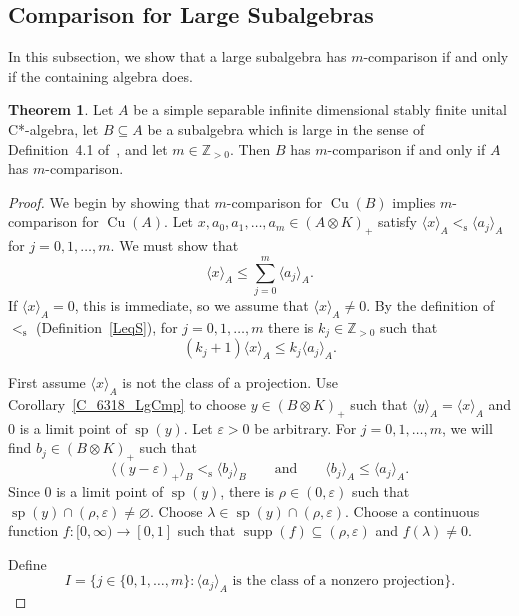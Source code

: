 \documentclass[10pt]{amsart}
\numberwithin{equation}{section}
\theoremstyle{definition}
\newtheorem{thm}{Theorem}[section]
\newcommand{\ep}{\varepsilon}
\newcommand{\ld}{\lambda}
\newcommand{\rh}{\rho}
\newcommand{\N}{{\mathbb{Z}}_{> 0}}
\newcommand{\spec}{{\operatorname{sp}}}
\newcommand{\supp}{{\operatorname{supp}}}
\newcommand{\Cu}{{\operatorname{Cu}}}
\newcommand{\andeqn}{\qquad {\mbox{and}} \qquad}
\newcommand{\cfn}{continuous function}
\renewcommand{\S}{\subseteq}
\newcommand{\I}{\infty}
\newcommand{\E}{\varnothing}
\newcommand{\cc}[1]{\langle #1 \rangle}
\newcommand{\ccA}[1]{\langle #1 \rangle_A}
\newcommand{\ccB}[1]{\langle #1 \rangle_B}
\newcommand{\ten}{\otimes}
\newcommand{\les}{<_{\operatorname{s}}}
\begin{document}
\subsection{Comparison for Large Subalgebras}\label{Sec_6314_Comp}

In this subsection, we show that a
large subalgebra has $m$-comparison if and only if
the containing algebra does.

\begin{thm}\label{T_6314_CompThm}
Let $A$ be a simple separable infinite dimensional stably
finite unital C*-algebra, let $B \S A$ be a subalgebra
which is large in the sense of Definition~4.1 of~\cite{Phl40},
and let $m \in \N$.
Then $B$ has $m$-comparison if and only if $A$ has $m$-comparison.
\end{thm}

\begin{proof}
We begin by showing that $m$-comparison for $\Cu (B)$ implies
$m$-comparison for $\Cu (A)$.
Let $x, a_{0}, a_{1}, \ldots, a_{m} \in (A \ten K)_{+}$
satisfy $\cc{x}_A \les \cc{a_{j}}_A$ for
$j = 0, 1, \ldots, m$.
We must show that
%
\begin{equation}\label{Eq_6315_Cmp_to_pr}
\cc{x}_A \leq \sum_{j = 0}^m \cc{a_j}_A.
\end{equation}
%
If $\cc{x}_A = 0$, this is immediate, so we assume
that $\cc{x}_A \neq 0$.
By the definition of $\les$ (Definition~\ref{LeqS}),
for $j = 0, 1, \ldots, m$ there is $k_j \in \N$
such that
%
\begin{equation}\label{Eq_6318_M_SubS}
(k_j + 1) \ccA{x} \leq k_j \ccA{a_j}.
\end{equation}
%

First assume $\cc{x}_A$ is not the class of a projection.
Use Corollary~\ref{C_6318_LgCmp}
to choose $y \in (B \otimes K)_{+}$ such that $\ccA{y} = \ccA{x}$
and $0$ is a limit point of $\spec (y)$.
Let $\varepsilon > 0$ be arbitrary. For $j = 0, 1, \ldots, m$,
we will find $b_j \in (B \otimes K)_{+}$ such that
%
\begin{equation}\label{Eq_6318_L}
\ccB{(y - \ep)_{+}} \les \ccB{b_j}
\andeqn
\ccA{b_j} \leq \ccA{a_j}.
\end{equation}
%
Since $0$ is a limit point of $\spec (y)$,
there is $\rh \in (0, \ep)$ such that
$\spec (y) \cap (\rh, \ep) \neq \E$.
Choose $\ld \in \spec (y) \cap (\rh, \ep)$.
Choose a \cfn{} $f \colon [0, \I) \to [0, 1]$ such that
$\supp (f) \S (\rh, \ep)$ and $f (\ld) \neq 0$.

Define
\[
I = \bigl\{ j \in \{0, 1, \ldots, m\} \colon
 {\mbox{$\cc{a_j}_A$ is the class of a nonzero projection}} \bigr\}.
\]


\end{proof}
\end{document}
